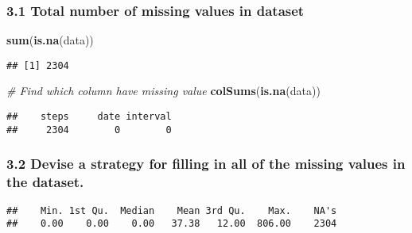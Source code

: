 \documentclass[
]{article}
\newenvironment{Shaded}{\begin{snugshade}}{\end{snugshade}}
\newcommand{\CommentTok}[1]{\textcolor[rgb]{0.56,0.35,0.01}{\textit{#1}}}
\newcommand{\DataTypeTok}[1]{\textcolor[rgb]{0.13,0.29,0.53}{#1}}
\newcommand{\KeywordTok}[1]{\textcolor[rgb]{0.13,0.29,0.53}{\textbf{#1}}}
\newcommand{\NormalTok}[1]{#1}
\newcommand{\OperatorTok}[1]{\textcolor[rgb]{0.81,0.36,0.00}{\textbf{#1}}}
\newcommand{\OtherTok}[1]{\textcolor[rgb]{0.56,0.35,0.01}{#1}}
\begin{document}
\hypertarget{total-number-of-missing-values-in-dataset}{%
\subsubsection{3.1 Total number of missing values in
dataset}\label{total-number-of-missing-values-in-dataset}}

\begin{Shaded}
\begin{Highlighting}[]
\KeywordTok{sum}\NormalTok{(}\KeywordTok{is.na}\NormalTok{(data))}
\end{Highlighting}
\end{Shaded}

\begin{verbatim}
## [1] 2304
\end{verbatim}

\begin{Shaded}
\begin{Highlighting}[]
\CommentTok{# Find which column have missing value}
\KeywordTok{colSums}\NormalTok{(}\KeywordTok{is.na}\NormalTok{(data))}
\end{Highlighting}
\end{Shaded}

\begin{verbatim}
##    steps     date interval 
##     2304        0        0
\end{verbatim}

\hypertarget{devise-a-strategy-for-filling-in-all-of-the-missing-values-in-the-dataset.}{%
\subsubsection{3.2 Devise a strategy for filling in all of the missing
values in the
dataset.}\label{devise-a-strategy-for-filling-in-all-of-the-missing-values-in-the-dataset.}}

\begin{Shaded}
\end{Shaded}

\begin{verbatim}
##    Min. 1st Qu.  Median    Mean 3rd Qu.    Max.    NA's 
##    0.00    0.00    0.00   37.38   12.00  806.00    2304
\end{verbatim}
\end{document}
